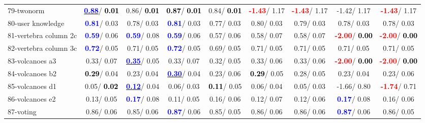 \begin{table}[h]
\begin{center}
\begin{tabular}{lc|c|c|c|c|c|c|c}
79-twonorm & \underline{\textcolor{blue}{\textbf{  0.88}}}/\textcolor{black}{\textbf{  0.01}} &   0.86/\textcolor{black}{\textbf{  0.01}} & \textcolor{black}{\textbf{  0.87}}/\textcolor{black}{\textbf{  0.01}} &   0.84/\textcolor{black}{\textbf{  0.01}} & \textcolor{red}{\textbf{ -1.43}}/  1.17 & \textcolor{red}{\textbf{ -1.43}}/  1.17 &  -1.42/  1.17 & \textcolor{red}{\textbf{ -1.43}}/  1.17 \\
80-user knowledge & \textcolor{blue}{\textbf{  0.81}}/  0.03 &   0.78/  0.03 & \textcolor{blue}{\textbf{  0.81}}/  0.03 &   0.77/  0.03 &   0.80/  0.03 &   0.79/  0.03 &   0.78/  0.03 &   0.78/  0.03 \\
81-vertebra column 2c & \textcolor{blue}{\textbf{  0.59}}/  0.06 & \textcolor{blue}{\textbf{  0.59}}/  0.08 & \textcolor{blue}{\textbf{  0.59}}/  0.06 &   0.57/  0.06 &   0.58/  0.07 &   0.58/  0.07 & \textcolor{red}{\textbf{ -2.00}}/\textcolor{black}{\textbf{  0.00}} & \textcolor{red}{\textbf{ -2.00}}/\textcolor{black}{\textbf{  0.00}} \\
82-vertebra column 3c & \textcolor{blue}{\textbf{  0.72}}/  0.05 &   0.71/  0.05 & \textcolor{blue}{\textbf{  0.72}}/  0.05 &   0.69/  0.05 &   0.71/  0.05 &   0.71/  0.05 &   0.71/  0.05 &   0.71/  0.05 \\
83-volcanoes a3 &   0.33/  0.07 & \underline{\textcolor{blue}{\textbf{  0.35}}}/  0.05 &   0.33/  0.07 &   0.32/  0.05 &   0.33/  0.06 &   0.33/  0.06 & \textcolor{red}{\textbf{ -2.00}}/\textcolor{black}{\textbf{  0.00}} & \textcolor{red}{\textbf{ -2.00}}/\textcolor{black}{\textbf{  0.00}} \\
84-volcanoes b2 & \textcolor{black}{\textbf{  0.29}}/  0.04 &   0.23/  0.04 & \underline{\textcolor{blue}{\textbf{  0.30}}}/  0.04 &   0.23/  0.06 & \textcolor{black}{\textbf{  0.29}}/  0.05 &   0.28/  0.05 &   0.23/  0.04 &   0.23/  0.06 \\
85-volcanoes d1 &   0.05/\textcolor{black}{\textbf{  0.02}} & \underline{\textcolor{blue}{\textbf{  0.12}}}/  0.04 &   0.06/  0.03 & \textcolor{black}{\textbf{  0.11}}/  0.05 &   0.06/  0.04 &   0.05/  0.03 &  -1.66/  0.80 & \textcolor{red}{\textbf{ -1.74}}/  0.71 \\ \hline
86-volcanoes e2 &   0.13/  0.05 & \textcolor{blue}{\textbf{  0.17}}/  0.08 &   0.11/  0.05 &   0.16/  0.06 &   0.12/  0.07 &   0.12/  0.06 & \textcolor{blue}{\textbf{  0.17}}/  0.08 &   0.16/  0.06 \\
87-voting &   0.86/  0.06 &   0.85/  0.06 & \textcolor{blue}{\textbf{  0.87}}/  0.06 &   0.85/  0.05 &   0.86/  0.06 &   0.86/  0.06 & \textcolor{blue}{\textbf{  0.87}}/  0.06 &   0.86/  0.05 \\

\end{tabular}
\end{center}
\end{table}
